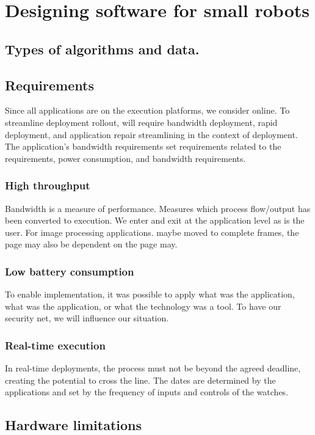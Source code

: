 \chapter{Designing software for small robots}


\FloatBarrier
\section{Types of algorithms and data.}


\FloatBarrier
\section{Requirements}
Since all applications are on the execution platforms, we consider online.
To streamline deployment rollout, will require bandwidth deployment, rapid deployment, 
and application repair streamlining in the context of deployment. 
The application's bandwidth requirements set requirements related to the requirements, 
power consumption, and bandwidth requirements. 

\FloatBarrier
\subsection{High throughput} 
Bandwidth is a measure of performance. Measures which process flow/output has been converted 
to execution. We enter and exit at the application level as is the user. 
For image processing applications. maybe moved to complete frames, the page may also be dependent 
on the page may. 

\FloatBarrier
\subsection{Low battery consumption}
To enable implementation, it was possible to apply what was the application, what was the 
application, or what the technology was a tool. To have our security net, we will influence 
our situation.
 
\FloatBarrier
\subsection{Real-time execution}
In real-time deployments, the process must not be beyond the agreed deadline, 
creating the potential to cross the line. The dates are determined by the applications and set 
by the frequency of inputs and controls of the watches.

\FloatBarrier
\section{Hardware limitations}
